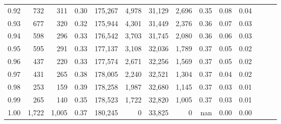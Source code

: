 \begin{tabular}{rrrrrrrrrrrrrr}
0.92 &    732 &    311 &  0.30 &  175,267 &    4,978 &  31,129 &   2,696 &  0.35 &  0.08 &      0.04 \\
0.93 &    677 &    320 &  0.32 &  175,944 &    4,301 &  31,449 &   2,376 &  0.36 &  0.07 &      0.03 \\
0.94 &    598 &    296 &  0.33 &  176,542 &    3,703 &  31,745 &   2,080 &  0.36 &  0.06 &      0.03 \\
0.95 &    595 &    291 &  0.33 &  177,137 &    3,108 &  32,036 &   1,789 &  0.37 &  0.05 &      0.02 \\
0.96 &    437 &    220 &  0.33 &  177,574 &    2,671 &  32,256 &   1,569 &  0.37 &  0.05 &      0.02 \\
0.97 &    431 &    265 &  0.38 &  178,005 &    2,240 &  32,521 &   1,304 &  0.37 &  0.04 &      0.02 \\
0.98 &    253 &    159 &  0.39 &  178,258 &    1,987 &  32,680 &   1,145 &  0.37 &  0.03 &      0.01 \\
0.99 &    265 &    140 &  0.35 &  178,523 &    1,722 &  32,820 &   1,005 &  0.37 &  0.03 &      0.01 \\
1.00 &  1,722 &  1,005 &  0.37 &  180,245 &        0 &  33,825 &       0 &   nan &  0.00 &      0.00 \\
\bottomrule
\end{tabular}
